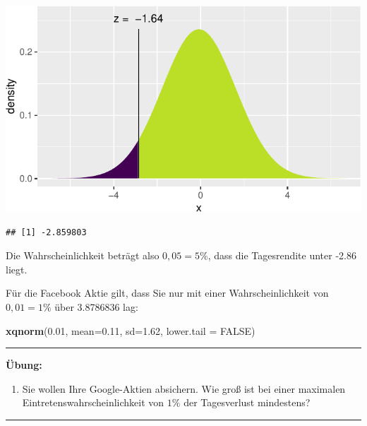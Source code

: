 \documentclass[12pt,ngerman,paper=a4,pagesize,DIV=13]{scrreprt}
\newenvironment{Shaded}{\begin{snugshade}}{\end{snugshade}}
\newcommand{\DataTypeTok}[1]{\textcolor[rgb]{0.13,0.29,0.53}{#1}}
\newcommand{\FloatTok}[1]{\textcolor[rgb]{0.00,0.00,0.81}{#1}}
\newcommand{\KeywordTok}[1]{\textcolor[rgb]{0.13,0.29,0.53}{\textbf{#1}}}
\newcommand{\NormalTok}[1]{#1}
\newcommand{\OtherTok}[1]{\textcolor[rgb]{0.56,0.35,0.01}{#1}}
\providecommand{\tightlist}{%
  \setlength{\itemsep}{0pt}\setlength{\parskip}{0pt}}
\begin{document}
\includegraphics{DatenerhebungStatistik-Uebung_files/figure-latex/unnamed-chunk-96-1.pdf}

\begin{verbatim}
## [1] -2.859803
\end{verbatim}

Die Wahrscheinlichkeit beträgt also \(0,05=5\%\), dass die Tagesrendite
unter -2.86 liegt.

Für die Facebook Aktie gilt, dass Sie nur mit einer Wahrscheinlichkeit
von \(0,01=1\%\) über 3.8786836 lag:

\begin{Shaded}
\begin{Highlighting}[]
\KeywordTok{xqnorm}\NormalTok{(}\FloatTok{0.01}\NormalTok{, }\DataTypeTok{mean=}\FloatTok{0.11}\NormalTok{, }\DataTypeTok{sd=}\FloatTok{1.62}\NormalTok{, }\DataTypeTok{lower.tail =} \OtherTok{FALSE}\NormalTok{)}
\end{Highlighting}
\end{Shaded}

\begin{center}\rule{0.5\linewidth}{\linethickness}\end{center}

\textbf{Übung:}

\begin{enumerate}
\def\labelenumi{\arabic{enumi}.}
\setcounter{enumi}{5}
\tightlist
\item
  Sie wollen Ihre Google-Aktien absichern. Wie groß ist bei einer
  maximalen Eintretenswahrscheinlichkeit von \(1\%\) der Tagesverlust
  mindestens?
\end{enumerate}

\begin{center}\rule{0.5\linewidth}{\linethickness}\end{center}
\end{document}
